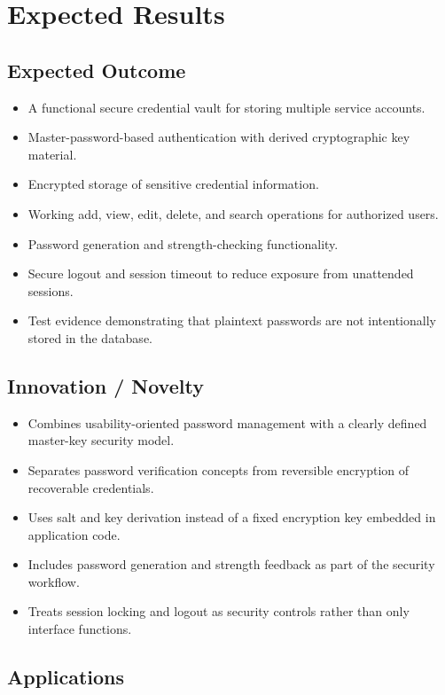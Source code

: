 \documentclass[12pt,a4paper,oneside]{report}
\begin{document}
\chapter{Expected Results}

\section{Expected Outcome}

\begin{itemize}
\item A functional secure credential vault for storing multiple service accounts.
\item Master-password-based authentication with derived cryptographic key material.
\item Encrypted storage of sensitive credential information.
\item Working add, view, edit, delete, and search operations for authorized users.
\item Password generation and strength-checking functionality.
\item Secure logout and session timeout to reduce exposure from unattended sessions.
\item Test evidence demonstrating that plaintext passwords are not intentionally stored in the database.
\end{itemize}

\section{Innovation / Novelty}

\begin{itemize}
\item Combines usability-oriented password management with a clearly defined master-key security model.
\item Separates password verification concepts from reversible encryption of recoverable credentials.
\item Uses salt and key derivation instead of a fixed encryption key embedded in application code.
\item Includes password generation and strength feedback as part of the security workflow.
\item Treats session locking and logout as security controls rather than only interface functions.
\end{itemize}

\section{Applications}
\end{document}
